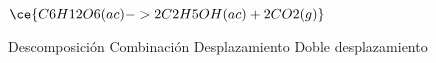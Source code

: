 $\ce{C6H12O6(ac) -> 2C2H5OH(ac) + 2CO2(g)}$

\begin{choices}
    \CorrectChoice Descomposición
    \choice Combinación
    \choice Desplazamiento
    \choice Doble desplazamiento
\end{choices}